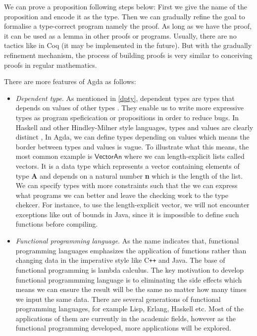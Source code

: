We can prove a proposition following steps below:
First we give the name of the proposition and encode it as the type. Then we can gradually refine the goal to formalise a type-correct program namely the proof. As long as we have the proof, it can be used as a lemma in other proofs or programs. Usually, there are no tactics like in Coq (it may be implemented in the future). But with the gradually refinement mechanism, the process of building proofs is very similar to conceiving proofs in regular mathematics.


There are more features of Agda as follows:

\begin{itemize}
\item \textit{Dependent type}. 
As mentioned in \ref{dpty}, dependent types are types that depends on values of other types \cite{dtw}. They enable us to write more expressive types as program speficication or propositions in order to reduce bugs. In Haskell and other Hindley-Milner style languages, types and values are clearly distinct \cite{tutorial}, In Agda, we can define types depending on values which means the border between types and values is vague. To illustrate what this means, the most common example is $\mathsf{Vector A n}$ where we can length-explicit lists called vectors. It is a data type which represents a vector containing elements of type \textbf{A} and depends on a natural number \textbf{n} which is the length of the list. We can specify types with more constraints such that the we can express what programs we can better and leave the checking work to the type chekcer. For instance, to use the length-explicit vector, we will not encounter exceptions like out of bounds in Java, since it is impossible to define such functions before compiling.

\item \textit{Functional programming language}. As the name indicates that, functional programming languages emphasizes the application of functions rather than changing data in the imperative style like C{}\verb!++! and Java. The base of functional programming is lambda calculus. The key motivation to develop functional programmming language is to eliminating the side effects which means we can ensure the result will be the same no matter how many times we input the same data. There are several generations of functional programming languages, for example Lisp, Erlang, Haskell etc. Most of the applications of them are currently in the academic fields, however as the functional programming developed, more applications will be explored.


\end{itemize}
